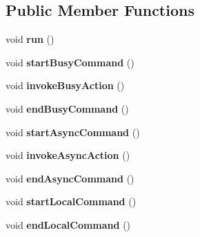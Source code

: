 \subsection*{\-Public \-Member \-Functions}
\begin{DoxyCompactItemize}
\item 
\hypertarget{interface_execute_on_e_d_t_aad2e6fcad7dbaafada1ac066303aed50}{
void {\bfseries run} ()}
\label{interface_execute_on_e_d_t_aad2e6fcad7dbaafada1ac066303aed50}

\item 
\hypertarget{interface_execute_on_e_d_t_aac301baf44c46b2268ae1e377209103e}{
void {\bfseries start\-Busy\-Command} ()}
\label{interface_execute_on_e_d_t_aac301baf44c46b2268ae1e377209103e}

\item 
\hypertarget{interface_execute_on_e_d_t_aefc632dcd000e4905cb57598c73c541a}{
void {\bfseries invoke\-Busy\-Action} ()}
\label{interface_execute_on_e_d_t_aefc632dcd000e4905cb57598c73c541a}

\item 
\hypertarget{interface_execute_on_e_d_t_a7c69e63a62d0c71d5384c36b3c628390}{
void {\bfseries end\-Busy\-Command} ()}
\label{interface_execute_on_e_d_t_a7c69e63a62d0c71d5384c36b3c628390}

\item 
\hypertarget{interface_execute_on_e_d_t_a278bf85f95f70581a07b988e7c3f0174}{
void {\bfseries start\-Async\-Command} ()}
\label{interface_execute_on_e_d_t_a278bf85f95f70581a07b988e7c3f0174}

\item 
\hypertarget{interface_execute_on_e_d_t_a64e6b836ea524c4ef4d09394c961aae7}{
void {\bfseries invoke\-Async\-Action} ()}
\label{interface_execute_on_e_d_t_a64e6b836ea524c4ef4d09394c961aae7}

\item 
\hypertarget{interface_execute_on_e_d_t_a6084a089ef8b1bf9e19c864db5475ff7}{
void {\bfseries end\-Async\-Command} ()}
\label{interface_execute_on_e_d_t_a6084a089ef8b1bf9e19c864db5475ff7}

\item 
\hypertarget{interface_execute_on_e_d_t_ad94b286ca3c87801bc4067fb223922a8}{
void {\bfseries start\-Local\-Command} ()}
\label{interface_execute_on_e_d_t_ad94b286ca3c87801bc4067fb223922a8}

\item 
\hypertarget{interface_execute_on_e_d_t_af0114a3d35985fd313736a2fee9bcd6d}{
void {\bfseries end\-Local\-Command} ()}
\label{interface_execute_on_e_d_t_af0114a3d35985fd313736a2fee9bcd6d}

\end{DoxyCompactItemize}
